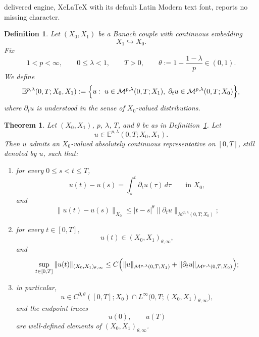 \documentclass[10pt,a4paper]{amsart}
\newtheorem{definition}{Definition}
\newtheorem{theorem}{Theorem}
\begin{document}
delivered engine, XeLaTeX with its default Latin Modern text font, reports no missing character.
	\begin{definition}\label{def:morrey-evolution-class}
		Let $(X_0,X_1)$ be a Banach couple with continuous embedding
		\[
		X_1\hookrightarrow X_0.
		\]
		Fix
		\[
		1<p<\infty,\qquad 0\le \lambda<1,\qquad T>0,
		\qquad
		\theta:=1-\frac{1-\lambda}{p}\in(0,1).
		\]
		We define
		\[
		\mathbb E^{p,\lambda}(0,T;X_0,X_1)
		:=
		\Bigl\{
		u:\;
		u\in \mathcal M^{p,\lambda}(0,T;X_1),\;
		\partial_t u\in \mathcal M^{p,\lambda}(0,T;X_0)
		\Bigr\},
		\]
		where $\partial_t u$ is understood in the sense of $X_0$-valued distributions.
	\end{definition}

\begin{theorem}\label{thm:morrey-trace-evolution}
		Let $(X_0,X_1)$, $p$, $\lambda$, $T$, and $\theta$ be as in Definition~\ref{def:morrey-evolution-class}. Let
		\[
		u\in \mathbb E^{p,\lambda}(0,T;X_0,X_1).
		\]
		Then $u$ admits an $X_0$-valued absolutely continuous representative on $[0,T]$, still denoted by $u$, such that:
		
		\begin{enumerate}[label=\textup{(\roman*)}]
			\item for every $0\le s<t\le T$,
			\[
			u(t)-u(s)=\int_s^t \partial_t u(\tau)\,d\tau
			\qquad\text{in }X_0,
			\]
			and
			\[
			\|u(t)-u(s)\|_{X_0}
			\le
			|t-s|^\theta
			\|\partial_t u\|_{\mathcal M^{p,\lambda}(0,T;X_0)};
			\]
			
			\item for every $t\in[0,T]$,
			\[
			u(t)\in (X_0,X_1)_{\theta,\infty},
			\]
			and
			\[
			\sup_{t\in[0,T]}
			\|u(t)\|_{(X_0,X_1)_{\theta,\infty}}
			\le
			C\Bigl(
			\|u\|_{\mathcal M^{p,\lambda}(0,T;X_1)}
			+
			\|\partial_t u\|_{\mathcal M^{p,\lambda}(0,T;X_0)}
			\Bigr);
			\]
			
			\item in particular,
			\[
			u\in C^{0,\theta}([0,T];X_0)\cap L^\infty\bigl(0,T;(X_0,X_1)_{\theta,\infty}\bigr),
			\]
			and the endpoint traces
			\[
			u(0),\qquad u(T)
			\]
			are well-defined elements of $(X_0,X_1)_{\theta,\infty}$.
		\end{enumerate}
	\end{theorem}
\end{document}
